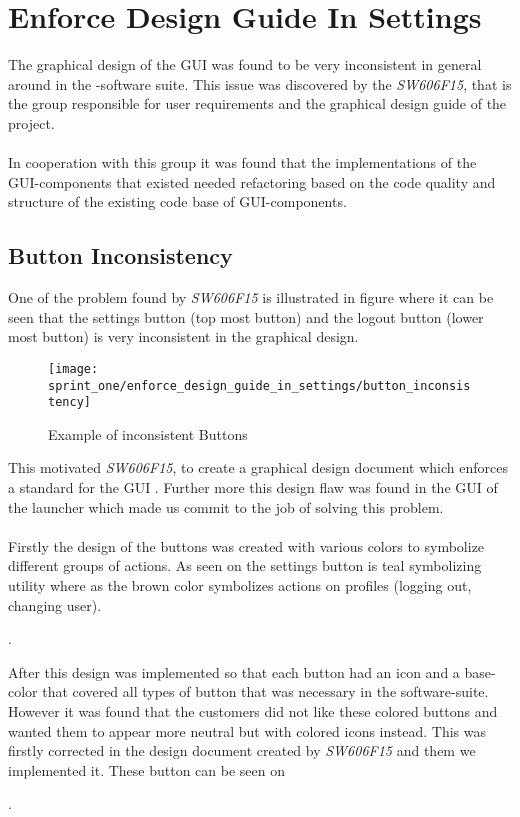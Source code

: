 \section{Enforce Design Guide In Settings}
\label{sec:enforce_design_guide_in_settings}

The graphical design of the GUI was found to be very inconsistent in general around in the \giraf-software suite. This issue was discovered by the \emph{SW606F15}, that is the group responsible for user requirements and the graphical design guide of the project.
\\\\
In cooperation with this group it was found that the implementations of the GUI-components that existed needed refactoring based on the code quality and structure of the existing code base of GUI-components.

\subsection{Button Inconsistency}
\label{sub:button_inconsistency}
One of the problem found by \emph{SW606F15} is illustrated in figure  where it can be seen that the settings button (top most button) and the logout button (lower most button) is very inconsistent in the graphical design. 

\begin{figure}[!htbp]
    \centering
    \texttt{[image: sprint\_one/enforce\_design\_guide\_in\_settings/button\_inconsistency]}
    \caption{Example of inconsistent Buttons}
    \label{fig:button_inconsistency}
\end{figure}

This motivated \emph{SW606F15}, to create a graphical design document which enforces a standard for the GUI . Further more this design flaw was found in the GUI of the launcher which made us commit to the job of solving this problem.
\\\\
Firstly the design of the buttons was created with various colors to symbolize different groups of actions. As seen on  the settings button is teal symbolizing utility where as the brown color symbolizes actions on profiles (logging out, changing user).  

.

After this design was implemented so that each button had an icon and a base-color that covered all types of button that was necessary in the \giraf software-suite. However it was found that the customers did not like these colored buttons and wanted them to appear more neutral but with colored icons instead. This was firstly corrected in the design document created by \emph{SW606F15} and them we implemented it. These button can be seen on 

.